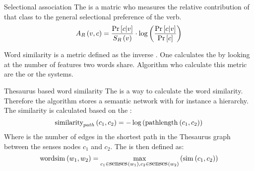 \begin{df}{Selectional association}
The \sb{} is a matric who measures the relative contribution of that class to the general selectional preference of the verb.
\begin{equation}
\fun{A_R}{v,c}=\displaystyle\frac{\Prob{c|v}}{\fun{S_R}{v}}\cdot\fun{\log}{\displaystyle\frac{\Prob{c|v}}{\Prob{c}}}
\end{equation}
\end{df}
\begin{df}{Word similarity}
\sb{} is a metric defined as the inverse . One calculates the \sb{} by looking at the number of features two words share. Algorithm who calculate this metric are the  or the  systems.
\end{df}
\begin{df}{Thesaurus based word similarity}
The \sb{} is a way to calculate the word similarity. Therefore the algorithm stores a semantic network with for instance a  hierarchy. The similarity is calculated based on the :
\begin{equation}
\funm[path]{similarity}{c_1,c_2}=-\fun{\log}{\funm{pathlength}{c_1,c_2}}
\end{equation}
Where  is the number of edges in the shortest path in the Thesaurus graph between the senses nodes $c_1$ and $c_2$. The  is then defined as:
\begin{equation}
\funm{wordsim}{w_1,w_2}=\fun{\max_{c_1\in\funm{senses}{w_1},c_2\in\funm{senses}{w_2}}}{\funm{sim}{c_1,c_2}}
\end{equation}
\end{df}